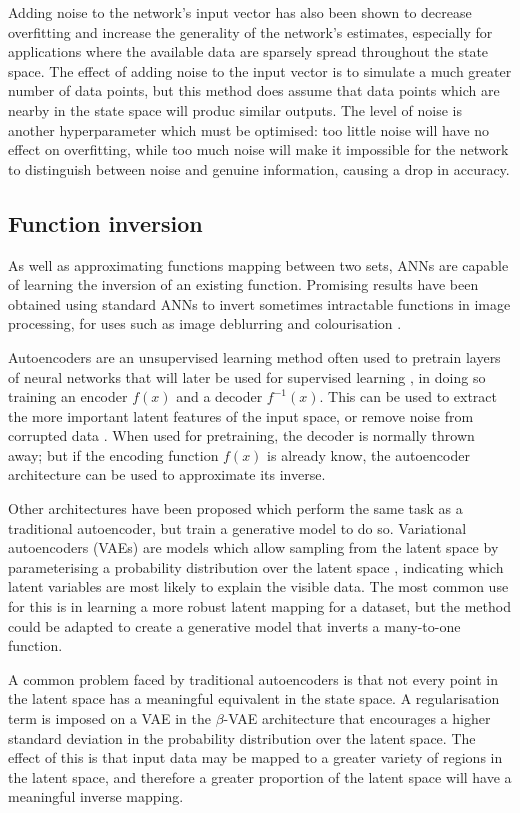 \documentclass[a4paper]{article}
\begin{document}
Adding noise to the network's input vector \cite{zur09} has also been shown to decrease overfitting and increase the generality of the network's estimates,
especially for applications where the available data are sparsely spread throughout the state space.
The effect of adding noise to the input vector is to simulate a much greater number of data points, but this method does
assume that data points which are nearby in the state space will produc similar outputs.
The level of noise is another hyperparameter which must be optimised: too little noise will have no effect on overfitting,
while too much noise will make it impossible for the network to distinguish between noise and genuine information, causing a drop in accuracy.

\subsection{Function inversion}

As well as approximating functions mapping between two sets, ANNs are capable of learning the inversion of an existing function.
Promising results have been obtained using standard ANNs to invert sometimes intractable functions in image processing,
for uses such as image deblurring \cite{nah18} and colourisation \cite{nguyen16}.

Autoencoders are an unsupervised learning method often used to pretrain layers of neural networks that will later be used for supervised learning \cite{rumelhart86},
in doing so training an encoder $f(x)$ and a decoder $f^{-1}(x)$.
This can be used to extract the more important latent features of the input space, or remove noise from corrupted data \cite{vincent08}.
When used for pretraining, the decoder is normally thrown away; but if the encoding function $f(x)$ is already know, the autoencoder architecture can be used to approximate its inverse.

Other architectures have been proposed which perform the same task as a traditional autoencoder, but train a generative model to do so.
Variational autoencoders (VAEs) are models which allow sampling from the latent space by parameterising a probability distribution over the latent space \cite{kingma14},
indicating which latent variables are most likely to explain the visible data.
The most common use for this is in learning a more robust latent mapping for a dataset, but the method could be adapted to create a generative model that inverts a many-to-one function.

A common problem faced by traditional autoencoders is that not every point in the latent space has a meaningful equivalent in the state space.
A regularisation term is imposed on a VAE in the $\beta$-VAE architecture \cite{higgins16} that encourages a higher standard deviation in the probability distribution over the latent space.
The effect of this is that input data may be mapped to a greater variety of regions in the latent space,
and therefore a greater proportion of the latent space will have a meaningful inverse mapping.
\end{document}
